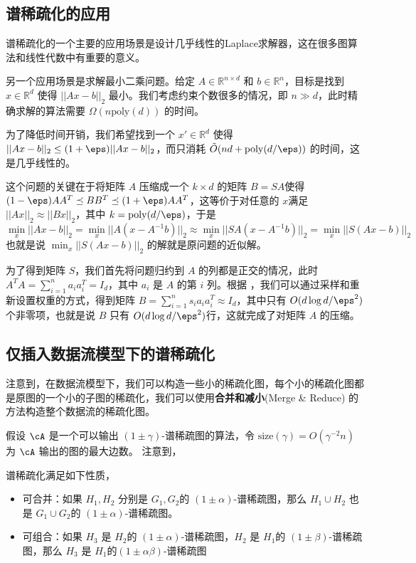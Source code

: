 \documentclass[lang=cn,newtx,10pt,scheme=chinese,chinesefont=nofont,citestyle=gb7714-2015, bibstyle=gb7714-2015]{elegantbook}
\begin{document}
\begin{refsection}
\subsection{谱稀疏化的应用}
谱稀疏化的一个主要的应用场景是设计几乎线性的Laplace求解器，这在很多图算法和线性代数中有重要的意义。

另一个应用场景是求解最小二乘问题。给定 $A\in \mathbb{R}^{n\times d}$ 和 $b\in \mathbb{R}^{n}$，目标是找到 $x\in \mathbb{R}^{d}$ 使得 $||Ax-b||_2$ 最小。我们考虑约束个数很多的情况，即 $n\gg d$，此时精确求解的算法需要 $\Omega(n\mathrm{poly}(d))$ 的时间。

为了降低时间开销，我们希望找到一个 $x'\in \mathbb{R}^{d}$ 使得 $||Ax-b||_2 \leq (1+\eps)||Ax-b||_2$，而只消耗 $\Tilde{O}(nd+\mathrm{poly}(d/\eps))$ 的时间，这是几乎线性的。

这个问题的关键在于将矩阵 $A$ 压缩成一个 $k\times d$ 的矩阵 $B=SA$使得 $(1-\eps)AA^T\preceq BB^T \preceq (1+\eps)AA^T$，这等价于对任意的 $x$满足 $||Ax||_2\approx ||Bx||_2$，其中 $k=\mathrm{poly}(d/\eps)$，于是 
\[
\min_x ||Ax-b||_2 =\min_x ||A(x-A^{-1}b)||_2 \approx \min_x ||SA(x-A^{-1}b)||_2 = \min_x ||S(Ax-b)||_2 
\]
也就是说 $\min_x||S(Ax-b)||_2$ 的解就是原问题的近似解。

为了得到矩阵 $S$，我们首先将问题归约到 $A$ 的列都是正交的情况，此时 $A^TA = \sum_{i=1}^n a_i a_i^T = I_d$，其中 $a_i$ 是 $A$ 的第 $i$ 列。根据 ，我们可以通过采样和重新设置权重的方式，得到矩阵 $B=\sum_{i=1}^n s_i a_i a_i^T\approx I_d$，其中只有 $O(d\log d/\eps^2)$ 个非零项，也就是说 $B$ 只有 $O(d\log d/\eps^2)$行，这就完成了对矩阵 $A$ 的压缩。

\subsection{仅插入数据流模型下的谱稀疏化}
注意到，在数据流模型下，我们可以构造一些小的稀疏化图，每个小的稀疏化图都是原图的一个小的子图的稀疏化，我们可以使用\textbf{合并和减小}(Merge \& Reduce) 的方法构造整个数据流的稀疏化图。

假设 $\cA$ 是一个可以输出 $(1\pm\gamma)$-谱稀疏图的算法，令 $\text{size}(\gamma)=O(\gamma^{-2}n)$ 为 $\cA$ 输出的图的最大边数。
注意到，
\begin{proposition}
\label{prop:merge_reduce}
谱稀疏化满足如下性质，
\begin{itemize}
    \item 可合并：如果 $H_1,H_2$ 分别是 $G_1,G_2$的 $(1\pm\alpha)$-谱稀疏图，那么 $H_1\cup H_2$ 也是 $G_1\cup G_2$的 $(1\pm\alpha)$-谱稀疏图。
    \item 可组合：如果 $H_3$ 是 $H_2$的 $(1\pm\alpha)$-谱稀疏图，$H_2$ 是 $H_1$的 $(1\pm\beta)$-谱稀疏图，那么 $H_3$ 是 $H_1$的$(1\pm\alpha \beta)$-谱稀疏图
\end{itemize}
    

\end{proposition}
\end{refsection}
\end{document}

